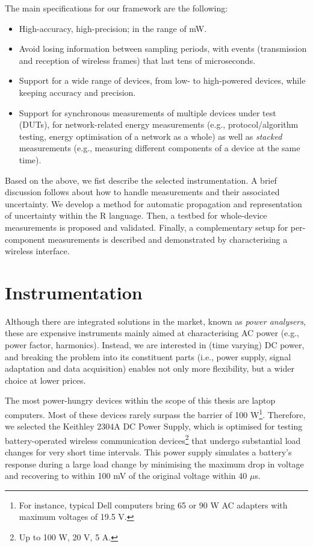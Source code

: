 \documentclass[twoside,nohyper]{tufte-book}
\providecommand{\tightlist}{%
  \setlength{\itemsep}{0pt}\setlength{\parskip}{0pt}}
\begin{document}
The main specifications for our framework are the following:

\begin{itemize}
\tightlist
\item
  High-accuracy, high-precision; in the range of mW.
\item
  Avoid losing information between sampling periods, with events (transmission and reception of wireless frames) that last tens of microseconds.
\item
  Support for a wide range of devices, from low- to high-powered devices, while keeping accuracy and precision.
\item
  Support for synchronous measurements of multiple devices under test (DUTs), for network-related energy measurements (e.g., protocol/algorithm testing, energy optimisation of a network as a whole) as well as \emph{stacked} measurements (e.g., measuring different components of a device at the same time).
\end{itemize}

Based on the above, we fist describe the selected instrumentation. A brief discussion follows about how to handle measurements and their associated uncertainty. We develop a method for automatic propagation and representation of uncertainty within the R language\cite[0pt]{R-base}. Then, a testbed for whole-device measurements is proposed and validated. Finally, a complementary setup for per-component measurements is described and demonstrated by characterising a wireless interface.

\hypertarget{instrumentation}{%
\section{Instrumentation}\label{instrumentation}}

Although there are integrated solutions in the market, known as \emph{power analysers}, these are expensive instruments mainly aimed at characterising AC power (e.g., power factor, harmonics). Instead, we are interested in (time varying) DC power, and breaking the problem into its constituent parts (i.e., power supply, signal adaptation and data acquisition) enables not only more flexibility, but a wider choice at lower prices.

The most power-hungry devices within the scope of this thesis are laptop computers. Most of these devices rarely surpass the barrier of 100 W\footnote{For instance, typical Dell computers bring 65 or 90 W AC adapters with maximum voltages of 19.5 V.}. Therefore, we selected the Keithley 2304A DC Power Supply, which is optimised for testing battery-operated wireless communication devices\footnote{Up to 100 W, 20 V, 5 A.} that undergo substantial load changes for very short time intervals. This power supply simulates a battery's response during a large load change by minimising the maximum drop in voltage and recovering to within 100 mV of the original voltage within 40 \(\mu\)s.
\end{document}
